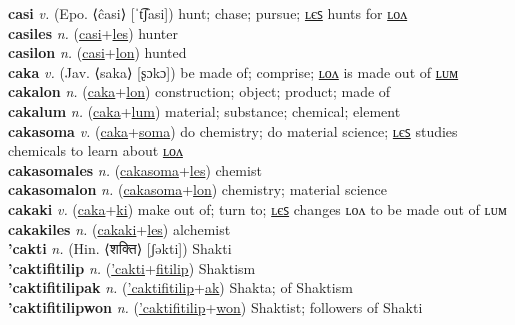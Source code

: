 \textbf{casi} \textit{v.} (Epo. ⟨ĉasi⟩ [ˈt͡ʃasi])
hunt; chase; pursue; \hyperref[casiles]{ʟєꜱ} hunts for \hyperref[casilon]{ʟᴏᴧ} \label{casi} \\
\textbf{casiles} \textit{n.} (\hyperref[casi]{casi}+\hyperref[les]{les})
hunter \label{casiles} \\
\textbf{casilon} \textit{n.} (\hyperref[casi]{casi}+\hyperref[lon]{lon})
hunted \label{casilon} \\
\textbf{caka} \textit{v.} (Jav. ⟨saka⟩ [ʂɔkɔ])
be made of; comprise; \hyperref[cakalon]{ʟᴏᴧ} is made out of \hyperref[cakalum]{ʟᴜᴍ} \label{caka} \\
\textbf{cakalon} \textit{n.} (\hyperref[caka]{caka}+\hyperref[lon]{lon})
construction; object; product; made of \label{cakalon} \\
\textbf{cakalum} \textit{n.} (\hyperref[caka]{caka}+\hyperref[lum]{lum})
material; substance; chemical; element \label{cakalum} \\
\textbf{cakasoma} \textit{v.} (\hyperref[caka]{caka}+\hyperref[soma]{soma})
do chemistry; do material science; \hyperref[cakasomales]{ʟєꜱ} studies chemicals to learn about \hyperref[cakasomalon]{ʟᴏᴧ} \label{cakasoma} \\
\textbf{cakasomales} \textit{n.} (\hyperref[cakasoma]{cakasoma}+\hyperref[les]{les})
chemist \label{cakasomales} \\
\textbf{cakasomalon} \textit{n.} (\hyperref[cakasoma]{cakasoma}+\hyperref[lon]{lon})
chemistry; material science \label{cakasomalon} \\
\textbf{cakaki} \textit{v.} (\hyperref[caka]{caka}+\hyperref[ki]{ki})
make out of; turn to; \hyperref[cakakiles]{ʟєꜱ} changes ʟᴏᴧ to be made out of ʟᴜᴍ \label{cakaki} \\
\textbf{cakakiles} \textit{n.} (\hyperref[cakaki]{cakaki}+\hyperref[les]{les})
alchemist \label{cakakiles} \\
\textbf{'cakti} \textit{n.} (Hin. ⟨शक्ति⟩ [ʃəkti])
Shakti \label{'cakti} \\
\textbf{'caktifitilip} \textit{n.} (\hyperref['cakti]{'cakti}+\hyperref[fitilip]{fitilip})
Shaktism \label{'caktifitilip} \\
\textbf{'caktifitilipak} \textit{n.} (\hyperref['caktifitilip]{'caktifitilip}+\hyperref[ak]{ak})
Shakta; of Shaktism \label{'caktifitilipak} \\
\textbf{'caktifitilipwon} \textit{n.} (\hyperref['caktifitilip]{'caktifitilip}+\hyperref[won]{won})
Shaktist; followers of Shakti \label{'caktifitilipwon} \\
